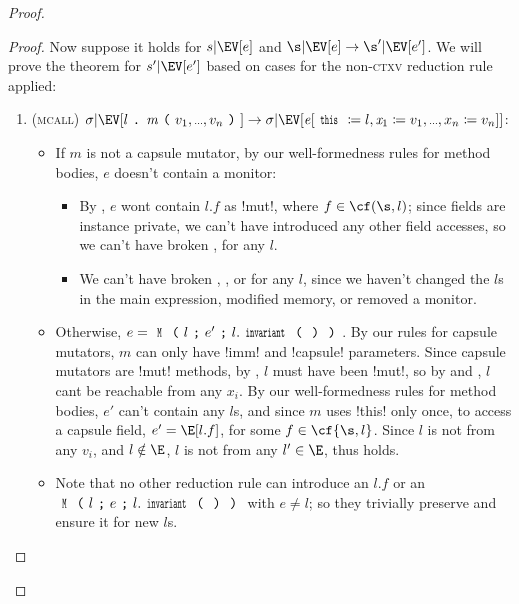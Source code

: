 \begin{proof}
\begin{proof}
{Now suppose it holds for $s|\EV[e]$ and $\s|\EV[e] \rightarrow \s'|\EV[e']$. We will prove the theorem for $s'|\EV[e']$ based on cases for the non-\textsc{ctxv} reduction rule applied:}
\clearpage
\SSI\begin{enumerate}
\item (\textsc{mcall}) $\sigma|\EV[l\singleDot\m\oR v_1,\ldots,v_n\cR]\rightarrow \sigma|\EV[\e[\Kw{this}\coloneqq l,\x_1\coloneqq v_1,\ldots,x_n\coloneqq v_n]]$:
\begin{itemize}
\item If $m$ is not a capsule mutator, by our well-formedness rules for method bodies, $e$ doesn't contain a monitor:
\begin{itemize}
		\item By , $e$ wont contain $l.f$ as \Q!mut!, where $f \in \cf(\s, l)$; since fields are instance private, we can't have introduced any other field accesses, so we can't have broken \CNA, for any $l$.
		\item We can't have broken \CNC, \CNE, or \CNO for any $l$, since we haven't changed the $l$s in the main expression, modified memory, or removed a monitor.
\end{itemize}
\item Otherwise, $e = \M{l}{e'}{l.\invariant}$. By our rules for capsule mutators, $m$ can only have \Q!imm! and \Q!capsule! parameters. Since capsule mutators are \Q!mut! methods, by , $l$ must have been \Q!mut!, so by  and , $l$ cant be reachable from any $x_i$. By our well-formedness rules for method bodies, $e'$ can't contain any $l$s, and since $m$ uses \Q!this! only once, to access a capsule field, $e' = \E[l.f]$, for some $f \in \cf{\s, l}$. Since $l$ is not \reach from any $v_i$, and $l \notin \E$, $l$ is not \reach from any $l' \in \E$, thus \CNO holds.
\item Note that no other reduction rule can introduce an $l.f$ or an $\M{l}{e}{l.\invariant}$ with $e \neq l$; so they trivially preserve \CNA and ensure it for new $l$s.
\end{itemize}


\end{enumerate}
\end{proof}
\end{proof}
